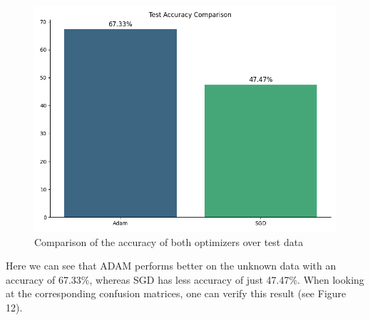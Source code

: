 \documentclass{tubaf-article}
\begin{document}
	\begin{figure}[h!]
		\centering
		\includegraphics[width=\textwidth]{test_acc.png}
		\caption{Comparison of the accuracy of both optimizers over test data}
	\end{figure}
	Here we can see that ADAM performs better on the unknown data with an accuracy of 67.33\%, whereas SGD has less accuracy of just 47.47\%. When looking at the corresponding confusion matrices, one can verify this result (see Figure 12).
	
\end{document}

